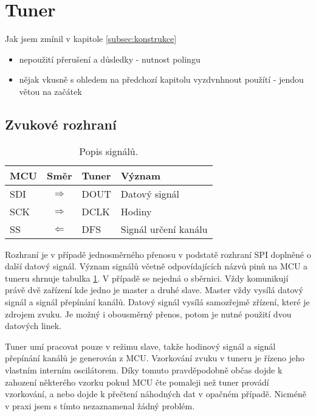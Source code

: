 \section{Tuner}
\label{sec:tuner}
Jak jsem zmínil v kapitole \ref{subsec:konstrukce}
\begin{itemize}
\item nepoužití přerušení a důsledky - nutnost polingu
\item nějak vkusně s ohledem na předchozí kapitolu vyzdvnhnout použítí \iic - jendou větou na začátek
\end{itemize}


\subsection{Zvukové rozhraní \iis}

\begin{table}[ht!]
\begin{center}
\begin{tabular}{|l|c|l|l|}
\hline 
MCU & Směr & Tuner & Význam \\ 
\hline 
SDI & $\Rightarrow$ & DOUT & Datový signál \\ 
\hline 
SCK & $\Rightarrow$ & DCLK & Hodiny \\ 
\hline
SS & $\Leftarrow$ & DFS & Signál určení kanálu \\ 
\hline 
\end{tabular}
\end{center}
\caption{Popis \iis signálů.}
\label{tab:iis_signals} 
\end{table}


Rozhraní \iis je v případě jednosměrného přenosu v podstatě rozhraní SPI doplněné o další datový signál. Význam signálů včetně odpovídajících názvů pinů na MCU a tuneru shrnuje tabulka \ref{tab:iis_signals}. V případě \iis se nejedná o sběrnici. Vždy komunikují právě dvě zařízení kde jedno je master a druhé slave. Master vždy vysílá datový signál a signál přepínání kanálů. Datový signál vysílá samozřejmě zřízení, které je zdrojem zvuku. Je možný i obousměrný přenos, potom je nutné použití dvou datových linek.

Tuner umí pracovat pouze v režimu slave, takže hodinový signál a signál přepínání kanálů je generován z MCU. Vzorkování zvuku v tuneru je řízeno jeho vlastním interním oscilátorem. Díky tomuto pravděpodobně občas dojde k zahození některého vzorku pokud MCU čte pomaleji než tuner provádí vzorkování, a nebo dojde k přečtení náhodných dat v opačném případě. Nicméně v praxi jsem s tímto nezaznamenal žádný problém.  

